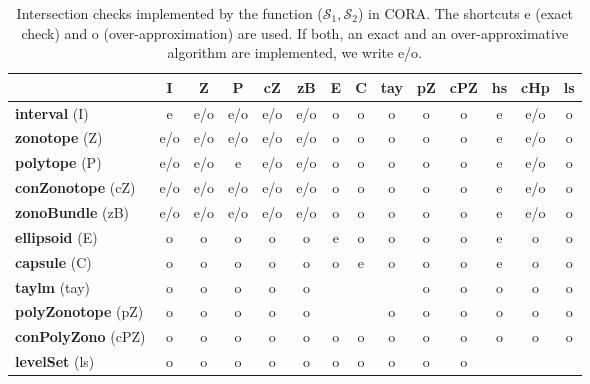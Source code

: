 \begin{table}[htb]
	\centering
	\footnotesize
	\caption{Intersection checks implemented by the function ($\mathcal{S}_1,\mathcal{S}_2$) in CORA. The shortcuts e (exact check) and o (over-approximation) are used. If both, an exact and an over-approximative algorithm are implemented, we write e/o.}
	\label{tab:isIntersecting}
	\begin{tabular}{ l c c c c c c c c c c c c c}
		\toprule
					 & \textbf{I} & \textbf{Z} & \textbf{P} & \textbf{cZ} & \textbf{zB} & \textbf{E} & \textbf{C} & \textbf{tay} & \textbf{pZ} & \textbf{cPZ} & \textbf{hs} & \textbf{cHp} & \textbf{ls} \\
		\midrule
		\textbf{interval} (I)       		  & e   & e/o & e/o & e/o & e/o & o & o & o & o & o & e & e/o & o\\
		\textbf{zonotope} (Z)      		      & e/o & e/o & e/o & e/o & e/o & o & o & o & o & o & e & e/o & o\\
		\textbf{polytope} (P)   	          & e/o & e/o & e   & e/o & e/o & o & o & o & o & o & e & e/o & o\\
		\textbf{conZonotope} (cZ)		      & e/o & e/o & e/o & e/o & e/o & o & o & o & o & o & e & e/o & o\\
		\textbf{zonoBundle} (zB)  	      	  & e/o & e/o & e/o & e/o & e/o & o & o & o & o & o & e & e/o & o\\
		\textbf{ellipsoid} (E)       	      & o   & o   & o   & o   & o   & e & o & o & o & o & e & o & o\\
		\textbf{capsule} (C)				  & o   & o   & o   & o   & o   & o & e & o & o & o & e & o & o\\
		\textbf{taylm} (tay)    	          & o   & o   & o   & o   & o   &   &   &   & o & o & o & o & o\\
		\textbf{polyZonotope} (pZ)		      & o   & o   & o   & o   & o   &   &   & o & o & o & o & o & o\\
		\textbf{conPolyZono} (cPZ)		      & o   & o   & o   & o   & o   & o & o & o & o & o & o & o & o\\
		\textbf{levelSet} (ls)		  		  & o   & o   & o   & o   & o   & o & o & o & o & o &   &  & \\
		\bottomrule
	\end{tabular}
\end{table}




